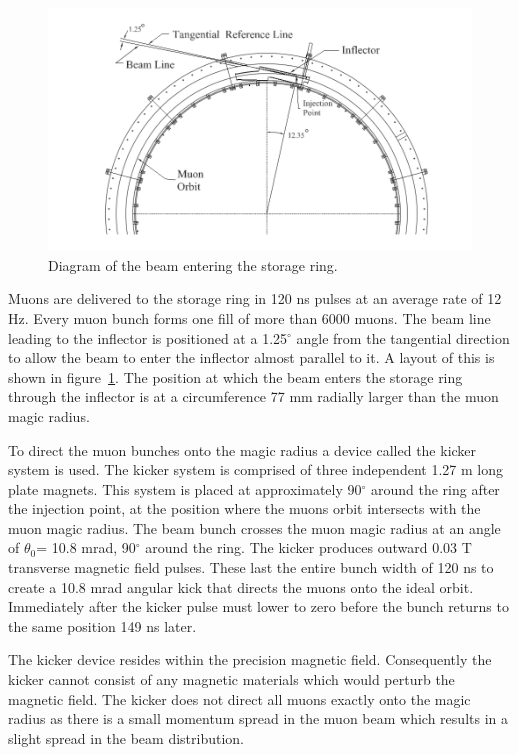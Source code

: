 \begin{figure}[th]
\centering
\includegraphics[scale=0.8]{Figures/injectionbeamline}
\decoRule
\caption{Diagram of the beam entering the storage ring.}
\label{fig:injectionbeamline}
\end{figure}

Muons are delivered to the storage ring in 120 ns pulses at an average rate of 12 Hz. Every muon bunch forms one fill of more than 6000 muons. The beam line leading to the inflector is positioned at a 1.25$^{\circ}$ angle from the tangential direction to allow the beam to enter the inflector almost parallel to it. A layout of this is shown in figure~\ref{fig:injectionbeamline}. The position at which the beam enters the storage ring through the inflector is at a circumference 77 mm radially larger than the muon magic radius. 

To direct the muon bunches onto the magic radius a device called the kicker system is used. The kicker system is comprised of three independent 1.27 m long plate magnets. This system is placed at approximately 90$^{\circ}$ around the ring after the injection point, at the position where the muons orbit intersects with the muon magic radius. The beam bunch crosses the muon magic radius at an angle of $\theta_{0}$= 10.8 mrad, 90$^{\circ}$ around the ring. The kicker produces outward 0.03 T transverse magnetic field pulses. These last the entire bunch width of 120 ns to create a 10.8 mrad angular kick that directs the muons onto the ideal orbit. Immediately after the kicker pulse must lower to zero before the bunch returns to the same position 149 ns later.

The kicker device resides within the precision magnetic field. Consequently the kicker cannot consist of any magnetic materials which would perturb the magnetic field. The kicker does not direct all muons exactly onto the magic radius as there is a small momentum spread in the muon beam which results in a slight spread in the beam distribution.

